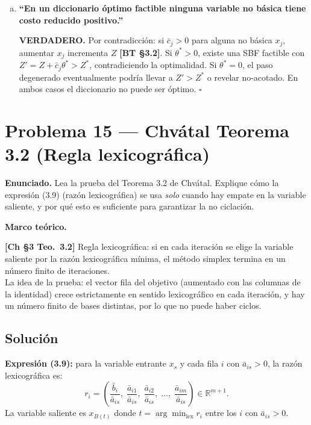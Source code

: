 \documentclass{article}
\newenvironment{marco}{\begin{mdframed}[linecolor=black!40,backgroundcolor=gray!5]\small\textbf{Marco teórico.}\par\smallskip}{\end{mdframed}\medskip}
\begin{document}
\begin{enumerate}[a)]
\item \textbf{``En un diccionario óptimo factible ninguna variable no básica tiene costo reducido positivo.''}

\textbf{VERDADERO.} Por contradicción: si $\bar{c}_j > 0$ para alguna no básica $x_j$, aumentar $x_j$ incrementa $Z$ \textbf{[BT §3.2]}. Si $\theta^* > 0$, existe una SBF factible con $Z' = Z + \bar{c}_j\theta^* > Z^*$, contradiciendo la optimalidad. Si $\theta^* = 0$, el paso degenerado eventualmente podría llevar a $Z' > Z^*$ o revelar no-acotado. En ambos casos el diccionario no puede ser óptimo. $\square$

\end{enumerate}

\section*{Problema 15 --- Chvátal Teorema 3.2 (Regla lexicográfica)}

\textbf{Enunciado.} Lea la prueba del Teorema 3.2 de Chvátal. Explique cómo la expresión (3.9) (razón lexicográfica) se usa \emph{solo} cuando hay empate en la variable saliente, y por qué esto es suficiente para garantizar la no ciclación.

\begin{marco}
\textbf{[Ch §3 Teo.\ 3.2]} Regla lexicográfica: si en cada iteración se elige la variable saliente por la razón lexicográfica mínima, el método simplex termina en un número finito de iteraciones. \\[2pt]
La idea de la prueba: el vector fila del objetivo (aumentado con las columnas de la identidad) crece estrictamente en sentido lexicográfico en cada iteración, y hay un número finito de bases distintas, por lo que no puede haber ciclos.
\end{marco}

\subsection*{Solución}

\textbf{Expresión (3.9):} para la variable entrante $x_s$ y cada fila $i$ con $\bar{a}_{is} > 0$, la razón lexicográfica es:
\[
  r_i = \left(\frac{\bar{b}_i}{\bar{a}_{is}},\; \frac{\bar{a}_{i1}}{\bar{a}_{is}},\; \frac{\bar{a}_{i2}}{\bar{a}_{is}},\; \ldots,\; \frac{\bar{a}_{im}}{\bar{a}_{is}}\right) \in \mathbb{R}^{m+1}.
\]
La variable saliente es $x_{B(t)}$ donde $t = \arg\min_{\text{lex}} r_i$ entre los $i$ con $\bar{a}_{is} > 0$.
\end{document}
